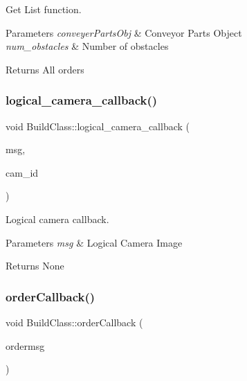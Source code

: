 Get List function. 


\begin{DoxyParams}{Parameters}
{\em conveyer\+Parts\+Obj} & Conveyor Parts Object \\
\hline
{\em num\+\_\+obstacles} & Number of obstacles \\
\hline
\end{DoxyParams}
\begin{DoxyReturn}{Returns}
All orders 
\end{DoxyReturn}
\mbox{\label{classBuildClass_a4d13438a582e88a6813385460d3c1a7f}} 
\subsubsection{\texorpdfstring{logical\+\_\+camera\+\_\+callback()}{logical\_camera\_callback()}}
{\footnotesize\ttfamily void Build\+Class\+::logical\+\_\+camera\+\_\+callback (\begin{DoxyParamCaption}\item[{const nist\+\_\+gear\+::\+Logical\+Camera\+Image\+::\+Const\+Ptr \&}]{msg,  }\item[{int}]{cam\+\_\+id }\end{DoxyParamCaption})}



Logical camera callback. 


\begin{DoxyParams}{Parameters}
{\em msg} & Logical Camera Image \\
\hline
\end{DoxyParams}
\begin{DoxyReturn}{Returns}
None 
\end{DoxyReturn}
\mbox{\label{classBuildClass_af3db7cdeb81f80f1b88f0cedb95d24e9}} 
\subsubsection{\texorpdfstring{order\+Callback()}{orderCallback()}}
{\footnotesize\ttfamily void Build\+Class\+::order\+Callback (\begin{DoxyParamCaption}\item[{const nist\+\_\+gear\+::\+Order \&}]{ordermsg }\end{DoxyParamCaption})}



